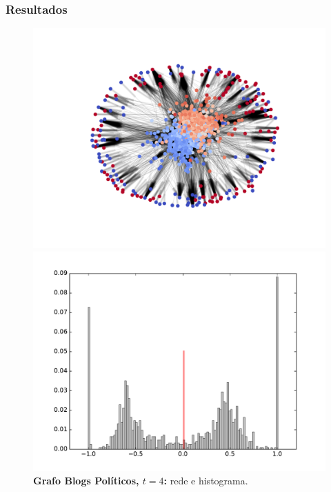 \begin{frame}
  \frametitle{Resultados}

  \begin{figure}
  \centering
  \begin{minipage}{5.5cm}
    \includegraphics[width=\textwidth]{./figures/99N004}
  \end{minipage}
  \begin{minipage}{5.5cm}
    \includegraphics[width=\textwidth]{./figures/99H004}
  \end{minipage}
  \vspace{5mm}
  \caption*{\textbf{Grafo Blogs Políticos, $t = 4$:} rede e histograma.}
  \end{figure}
\end{frame}

